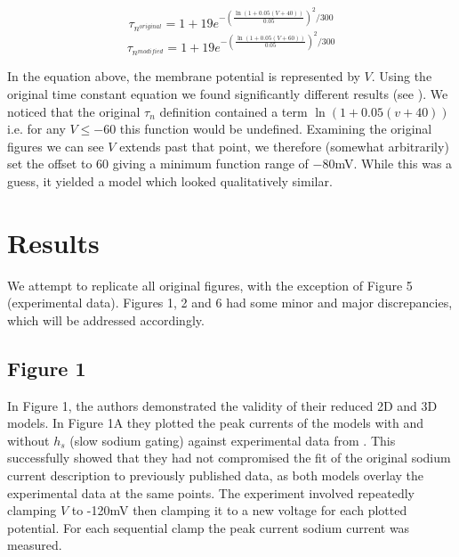 \begin{center}
	$$\tau_{n^{original}} = 1 + 19 e^{- \left(\frac{\ln\left(1 + 0.05 (V+40)\right)}{0.05}\right)^{2}/300}$$
	$$\tau_{n^{modified}} = 1 + 19 e^{- \left(\frac{\ln\left(1 + 0.05 (V+60)\right)}{0.05}\right)^{2}/300}$$
\end{center}

In the equation above, the membrane potential is represented by $V$. Using the original time constant equation we found significantly different results (see ). We noticed that the original $\tau_n$ definition contained a term $\ln\left(1 + 0.05 (v+40)\right)$ i.e. for any $V\leq-60$ this function would be undefined. Examining the original figures we can see $V$ extends past that point, we therefore (somewhat arbitrarily) set the offset to $60$ giving a minimum function range of $-80$mV. While this was a guess, it yielded a model which looked qualitatively similar.

\section{Results}

We attempt to replicate all original figures, with the exception of Figure 5 (experimental data). Figures 1, 2 and 6 had some minor and major discrepancies, which will be addressed accordingly.

\subsection{Figure 1}
In Figure 1, the authors demonstrated the validity of their reduced 2D and 3D models. In Figure 1A they plotted the peak currents of the models with and without $h_s$ (slow sodium gating) against experimental data from \cite{Seutin2010}. This successfully showed that they had not compromised the fit of the original sodium current description to previously published data, as both models overlay the experimental data at the same points. The experiment involved repeatedly clamping $V$ to -120mV then clamping it to a new voltage for each plotted potential. For each sequential clamp the peak current sodium current was measured.

